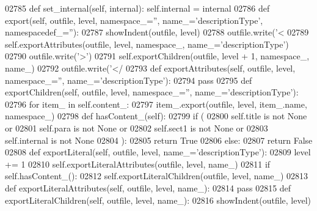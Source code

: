 \begin{DoxyCode}
{{{{{{{{{{{{{{{{{{{{{{{{{{{{{{{{{{{{{{{{{{{{{{{{{{{{{{{{{{{{{{{{{{{{{{{{{{{{{{{{{{{{{{{{{{{{{{{{{{{{{{{{{{{{{{{{{{{{{{{{{{{{{{{{{{{{{{{{{{{{{{{{{{{{{{{{{{{{{{{{{{{{{{{{{{{{{{{{{{{{{{{{{{{{{{{{{{{02785     \textcolor{keyword}{def }set_internal(self, internal): self.internal = internal
02786     \textcolor{keyword}{def }export(self, outfile, level, namespace\_='', name\_='descriptionType', namespacedef\_=''):
02787         showIndent(outfile, level)
02788         outfile.write(\textcolor{stringliteral}{'<%
02789         self.exportAttributes(outfile, level, namespace\_, name\_=\textcolor{stringliteral}{'descriptionType'})
02790         outfile.write(\textcolor{stringliteral}{'>'})
02791         self.exportChildren(outfile, level + 1, namespace\_, name\_)
02792         outfile.write(\textcolor{stringliteral}{'</%
02793     \textcolor{keyword}{def }exportAttributes(self, outfile, level, namespace\_='', name\_='descriptionType'):
02794         \textcolor{keywordflow}{pass}
02795     \textcolor{keyword}{def }exportChildren(self, outfile, level, namespace\_='', name\_='descriptionType'):
02796         \textcolor{keywordflow}{for} item\_ \textcolor{keywordflow}{in} self.content\_:
02797             item\_.export(outfile, level, item\_.name, namespace\_)
02798     \textcolor{keyword}{def }hasContent_(self):
02799         \textcolor{keywordflow}{if} (
02800             self.title \textcolor{keywordflow}{is} \textcolor{keywordflow}{not} \textcolor{keywordtype}{None} \textcolor{keywordflow}{or}
02801             self.para \textcolor{keywordflow}{is} \textcolor{keywordflow}{not} \textcolor{keywordtype}{None} \textcolor{keywordflow}{or}
02802             self.sect1 \textcolor{keywordflow}{is} \textcolor{keywordflow}{not} \textcolor{keywordtype}{None} \textcolor{keywordflow}{or}
02803             self.internal \textcolor{keywordflow}{is} \textcolor{keywordflow}{not} \textcolor{keywordtype}{None}
02804             ):
02805             \textcolor{keywordflow}{return} \textcolor{keyword}{True}
02806         \textcolor{keywordflow}{else}:
02807             \textcolor{keywordflow}{return} \textcolor{keyword}{False}
02808     \textcolor{keyword}{def }exportLiteral(self, outfile, level, name\_='descriptionType'):
02809         level += 1
02810         self.exportLiteralAttributes(outfile, level, name\_)
02811         \textcolor{keywordflow}{if} self.hasContent_():
02812             self.exportLiteralChildren(outfile, level, name\_)
02813     \textcolor{keyword}{def }exportLiteralAttributes(self, outfile, level, name\_):
02814         \textcolor{keywordflow}{pass}
02815     \textcolor{keyword}{def }exportLiteralChildren(self, outfile, level, name\_):
02816         showIndent(outfile, level)
}}}}}}}}}}}}}}}}}}}}}}}}}}}}}}}}}}}}}}}}}}}}}}}}}}}}}}}}}}}}}}}}}}}}}}}}}}}}}}}}}}}}}}}}}}}}}}}}}}}}}}}}}}}}}}}}}}}}}}}}}}}}}}}}}}}}}}}}}}}}}}}}}}}}}}}}}}}}}}}}}}}}}}}}}}}}}}}}}}}}}}}}}}}}}}}}}}}}}
\end{DoxyCode}

